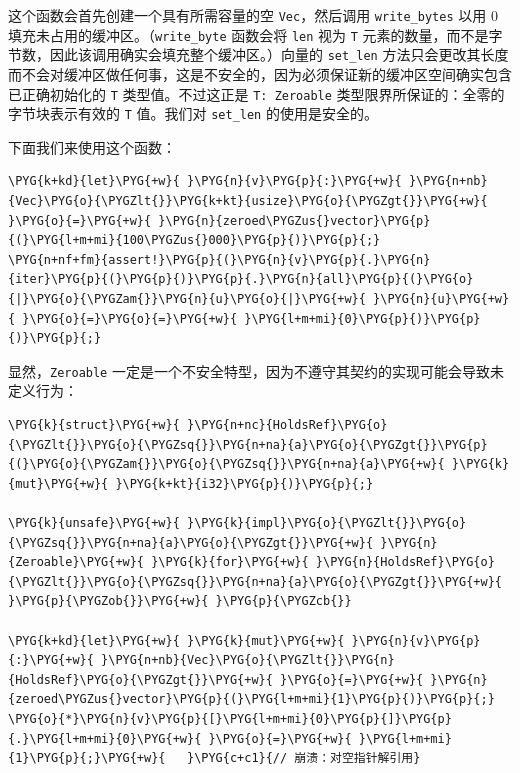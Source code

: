 这个函数会首先创建一个具有所需容量的空 \texttt{Vec}，然后调用 \texttt{write\_bytes} 以用 0 填充未占用的缓冲区。（\texttt{write\_byte} 函数会将 \texttt{len} 视为 \texttt{T} 元素的数量，而不是字节数，因此该调用确实会填充整个缓冲区。）向量的 \texttt{set\_len} 方法只会更改其长度而不会对缓冲区做任何事，这是不安全的，因为必须保证新的缓冲区空间确实包含已正确初始化的 \texttt{T} 类型值。不过这正是 \texttt{T: Zeroable} 类型限界所保证的：全零的字节块表示有效的 \texttt{T} 值。我们对 \texttt{set\_len} 的使用是安全的。

下面我们来使用这个函数：

\begin{Verbatim}[commandchars=\\\{\},breaklines=true,breakanywhere=true,fontsize=\codefont,xleftmargin=17bp]
\PYG{k+kd}{let}\PYG{+w}{ }\PYG{n}{v}\PYG{p}{:}\PYG{+w}{ }\PYG{n+nb}{Vec}\PYG{o}{\PYGZlt{}}\PYG{k+kt}{usize}\PYG{o}{\PYGZgt{}}\PYG{+w}{ }\PYG{o}{=}\PYG{+w}{ }\PYG{n}{zeroed\PYGZus{}vector}\PYG{p}{(}\PYG{l+m+mi}{100\PYGZus{}000}\PYG{p}{)}\PYG{p}{;}
\PYG{n+nf+fm}{assert!}\PYG{p}{(}\PYG{n}{v}\PYG{p}{.}\PYG{n}{iter}\PYG{p}{(}\PYG{p}{)}\PYG{p}{.}\PYG{n}{all}\PYG{p}{(}\PYG{o}{|}\PYG{o}{\PYGZam{}}\PYG{n}{u}\PYG{o}{|}\PYG{+w}{ }\PYG{n}{u}\PYG{+w}{ }\PYG{o}{=}\PYG{o}{=}\PYG{+w}{ }\PYG{l+m+mi}{0}\PYG{p}{)}\PYG{p}{)}\PYG{p}{;}
\end{Verbatim}

显然，\texttt{Zeroable} 一定是一个不安全特型，因为不遵守其契约的实现可能会导致未定义行为：

\begin{Verbatim}[commandchars=\\\{\},breaklines=true,breakanywhere=true,fontsize=\codefont,xleftmargin=17bp]
\PYG{k}{struct}\PYG{+w}{ }\PYG{n+nc}{HoldsRef}\PYG{o}{\PYGZlt{}}\PYG{o}{\PYGZsq{}}\PYG{n+na}{a}\PYG{o}{\PYGZgt{}}\PYG{p}{(}\PYG{o}{\PYGZam{}}\PYG{o}{\PYGZsq{}}\PYG{n+na}{a}\PYG{+w}{ }\PYG{k}{mut}\PYG{+w}{ }\PYG{k+kt}{i32}\PYG{p}{)}\PYG{p}{;}

\PYG{k}{unsafe}\PYG{+w}{ }\PYG{k}{impl}\PYG{o}{\PYGZlt{}}\PYG{o}{\PYGZsq{}}\PYG{n+na}{a}\PYG{o}{\PYGZgt{}}\PYG{+w}{ }\PYG{n}{Zeroable}\PYG{+w}{ }\PYG{k}{for}\PYG{+w}{ }\PYG{n}{HoldsRef}\PYG{o}{\PYGZlt{}}\PYG{o}{\PYGZsq{}}\PYG{n+na}{a}\PYG{o}{\PYGZgt{}}\PYG{+w}{ }\PYG{p}{\PYGZob{}}\PYG{+w}{ }\PYG{p}{\PYGZcb{}}

\PYG{k+kd}{let}\PYG{+w}{ }\PYG{k}{mut}\PYG{+w}{ }\PYG{n}{v}\PYG{p}{:}\PYG{+w}{ }\PYG{n+nb}{Vec}\PYG{o}{\PYGZlt{}}\PYG{n}{HoldsRef}\PYG{o}{\PYGZgt{}}\PYG{+w}{ }\PYG{o}{=}\PYG{+w}{ }\PYG{n}{zeroed\PYGZus{}vector}\PYG{p}{(}\PYG{l+m+mi}{1}\PYG{p}{)}\PYG{p}{;}
\PYG{o}{*}\PYG{n}{v}\PYG{p}{[}\PYG{l+m+mi}{0}\PYG{p}{]}\PYG{p}{.}\PYG{l+m+mi}{0}\PYG{+w}{ }\PYG{o}{=}\PYG{+w}{ }\PYG{l+m+mi}{1}\PYG{p}{;}\PYG{+w}{   }\PYG{c+c1}{// 崩溃：对空指针解引用}
\end{Verbatim}

